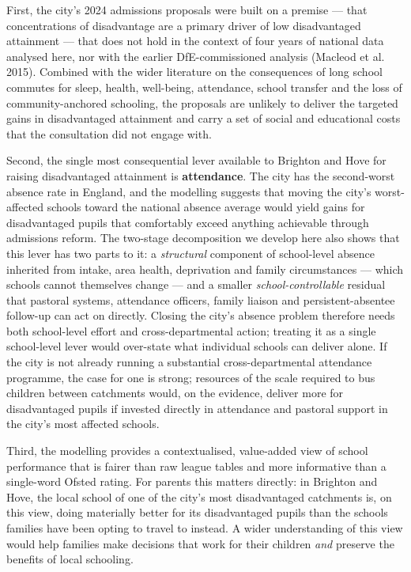 \documentclass[
  12pt,
  titlepage]{article}
\begin{document}
First, the city's 2024 admissions proposals were built on a premise ---
that concentrations of disadvantage are a primary driver of low
disadvantaged attainment --- that does not hold in the context of four
years of national data analysed here, nor with the earlier
DfE-commissioned analysis (Macleod et al. 2015). Combined with the wider
literature on the consequences of long school commutes for sleep,
health, well-being, attendance, school transfer and the loss of
community-anchored schooling, the proposals are unlikely to deliver the
targeted gains in disadvantaged attainment and carry a set of social and
educational costs that the consultation did not engage with.

Second, the single most consequential lever available to Brighton and
Hove for raising disadvantaged attainment is \textbf{attendance}. The
city has the second-worst absence rate in England, and the modelling
suggests that moving the city's worst-affected schools toward the
national absence average would yield gains for disadvantaged pupils that
comfortably exceed anything achievable through admissions reform. The
two-stage decomposition we develop here also shows that this lever has
two parts to it: a \emph{structural} component of school-level absence
inherited from intake, area health, deprivation and family circumstances
--- which schools cannot themselves change --- and a smaller
\emph{school-controllable} residual that pastoral systems, attendance
officers, family liaison and persistent-absentee follow-up can act on
directly. Closing the city's absence problem therefore needs both
school-level effort and cross-departmental action; treating it as a
single school-level lever would over-state what individual schools can
deliver alone. If the city is not already running a substantial
cross-departmental attendance programme, the case for one is strong;
resources of the scale required to bus children between catchments
would, on the evidence, deliver more for disadvantaged pupils if
invested directly in attendance and pastoral support in the city's most
affected schools.

Third, the modelling provides a contextualised, value-added view of
school performance that is fairer than raw league tables and more
informative than a single-word Ofsted rating. For parents this matters
directly: in Brighton and Hove, the local school of one of the city's
most disadvantaged catchments is, on this view, doing materially better
for its disadvantaged pupils than the schools families have been opting
to travel to instead. A wider understanding of this view would help
families make decisions that work for their children \emph{and} preserve
the benefits of local schooling.
\end{document}

